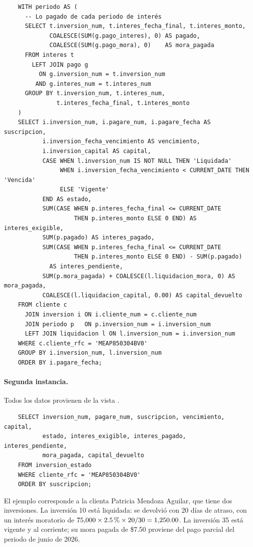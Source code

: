 \begin{verbatim}
	WITH periodo AS (
	  -- Lo pagado de cada periodo de interés
	  SELECT t.inversion_num, t.interes_fecha_final, t.interes_monto,
	         COALESCE(SUM(g.pago_interes), 0) AS pagado,
	         COALESCE(SUM(g.pago_mora), 0)    AS mora_pagada
	  FROM interes t
	    LEFT JOIN pago g
	      ON g.inversion_num = t.inversion_num
	     AND g.interes_num = t.interes_num
	  GROUP BY t.inversion_num, t.interes_num,
	           t.interes_fecha_final, t.interes_monto
	)
	SELECT i.inversion_num, i.pagare_num, i.pagare_fecha AS suscripcion,
	       i.inversion_fecha_vencimiento AS vencimiento,
	       i.inversion_capital AS capital,
	       CASE WHEN l.inversion_num IS NOT NULL THEN 'Liquidada'
	            WHEN i.inversion_fecha_vencimiento < CURRENT_DATE THEN 'Vencida'
	            ELSE 'Vigente'
	       END AS estado,
	       SUM(CASE WHEN p.interes_fecha_final <= CURRENT_DATE
	                THEN p.interes_monto ELSE 0 END) AS interes_exigible,
	       SUM(p.pagado) AS interes_pagado,
	       SUM(CASE WHEN p.interes_fecha_final <= CURRENT_DATE
	                THEN p.interes_monto ELSE 0 END) - SUM(p.pagado)
	         AS interes_pendiente,
	       SUM(p.mora_pagada) + COALESCE(l.liquidacion_mora, 0) AS mora_pagada,
	       COALESCE(l.liquidacion_capital, 0.00) AS capital_devuelto
	FROM cliente c
	  JOIN inversion i ON i.cliente_num = c.cliente_num
	  JOIN periodo p   ON p.inversion_num = i.inversion_num
	  LEFT JOIN liquidacion l ON l.inversion_num = i.inversion_num
	WHERE c.cliente_rfc = 'MEAP850304BV0'
	GROUP BY i.inversion_num, l.inversion_num
	ORDER BY i.pagare_fecha;
\end{verbatim}

\paragraph{Segunda instancia.} Todos los datos provienen de la vista .

\begin{verbatim}
	SELECT inversion_num, pagare_num, suscripcion, vencimiento, capital,
	       estado, interes_exigible, interes_pagado, interes_pendiente,
	       mora_pagada, capital_devuelto
	FROM inversion_estado
	WHERE cliente_rfc = 'MEAP850304BV0'
	ORDER BY suscripcion;
\end{verbatim}

El ejemplo corresponde a la clienta Patricia Mendoza Aguilar, que tiene dos inversiones. La inversi\'on 10 est\'a liquidada: se devolvi\'o con 20 d\'ias de atraso, con un inter\'es moratorio de $75{,}000 \times 2.5\mkern 3mu\% \times 20/30 = 1{,}250.00$. La inversi\'on 35 est\'a vigente y al corriente; su mora pagada de \$7.50 proviene del pago parcial del periodo de junio de 2026.

